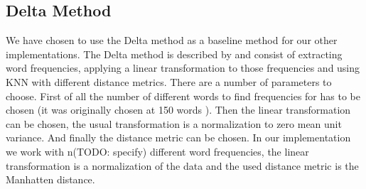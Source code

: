 

%
%
%

\subsection{Delta Method}
We have chosen to use the Delta method as a baseline method for our other
implementations. The Delta method is described by \cite{evert2015towards} and
consist of extracting word frequencies, applying a linear transformation to
those frequencies and using KNN with different distance metrics. There are a
number of parameters to choose. First of all the number of different words
to find frequencies for has to be chosen (it was originally chosen at 150
words \cite{evert2015towards}). Then the linear transformation can be chosen,
the usual transformation is a normalization to zero mean unit variance. And
finally the distance metric can be chosen. In our implementation we work with
n(TODO: specify) different word frequencies, the linear transformation is
a normalization of the data and the used distance metric is the Manhatten
distance.

